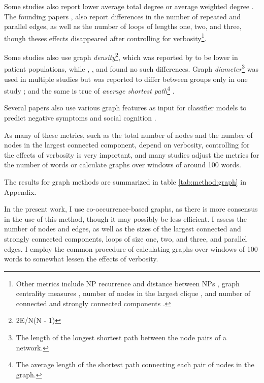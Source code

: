 Some studies also report lower average total degree \citep{mota2014graph} or average weighted degree \citep{nikzad2022does}. The founding papers \citep{mota2012speech, mota2014graph}, also report differences in the number of repeated and parallel edges, as well as the number of loops of lengths one, two, and three, though theses effects disappeared after controlling for verbosity\footnote{Other metrics include NP recurrence and distance between NPs \citep{palominos2023coreference}, graph centrality measures \citep{argolo2023burnishing}, number of nodes in the largest clique \citep{tang2022clinical, tang2023latent}, and number of connected and strongly connected components \citep{argolo2023burnishing, nettekoven2023semantic}.}.

Some studies also use graph \textit{density}\footnote{2E/N(N - 1)}, which was reported by \citet{nikzad2022does} to be lower in patient populations, while \citet{mota2012speech}, \citet{mota2014graph}, and \citep{argolo2023burnishing} found no such differences. Graph \textit{diameter}\footnote{The length of the longest shortest path between the node pairs of a network.} was used in multiple studies but was reported to differ between groups only in one study \citep{mota2014graph}; and the same is true of \textit{average shortest path}\footnote{The average length of the shortest path connecting each pair of nodes in the graph.} \citep{mota2012speech, nikzad2022does, tang2022clinical, argolo2023burnishing}. 

Several papers also use various graph features as input for classifier models to predict negative symptoms \citep{mota2022happy, tang2023latent} and social cognition \citep{tang2022clinical}.

As many of these metrics, such as the total number of nodes and the number of nodes in the largest connected component, depend on verbosity, controlling for the effects of verbosity is very important, and many studies adjust the metrics for the number of words or calculate graphs over windows of around 100 words.

The results for graph methods are summarized in table \ref{tab:method:graph} in Appendix.

In the present work, I use co-occurrence-based graphs, as there is more consensus in the use of this method, though it may possibly be less efficient. I assess the number of nodes and edges, as well as the sizes of the largest connected and strongly connected components, loops of size one, two, and three, and parallel edges. I employ the common procedure of calculating graphs over windows of 100 words to somewhat lessen the effects of verbosity.

